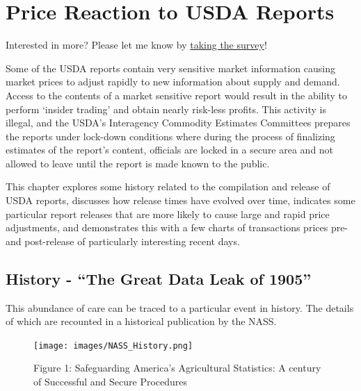 \documentclass[
  letterpaper,
  DIV=11,
  numbers=noendperiod]{scrreprt}
\begin{document}

\hypertarget{price-reaction-to-usda-reports-1}{%
\chapter{Price Reaction to USDA
Reports}\label{price-reaction-to-usda-reports-1}}

{Interested in more? Please let me know by}
\href{https://forms.gle/Q3VByCQZHjfQSy9D7}{taking the survey}!

Some of the USDA reports contain very sensitive market information
causing market prices to adjust rapidly to new information about supply
and demand. Access to the contents of a market sensitive report would
result in the ability to perform `insider trading' and obtain nearly
risk-less profits. This activity is illegal, and the USDA's Interagency
Commodity Estimates Committees prepares the reports under lock-down
conditions where during the process of finalizing estimates of the
report's content, officials are locked in a secure area and not allowed
to leave until the report is made known to the public.

This chapter explores some history related to the compilation and
release of USDA reports, discusses how release times have evolved over
time, indicates some particular report releases that are more likely to
cause large and rapid price adjustments, and demonstrates this with a
few charts of transactions prices pre- and post-release of particularly
interesting recent days.

\hypertarget{history---the-great-data-leak-of-1905-1}{%
\section{History - ``The Great Data Leak of
1905''}\label{history---the-great-data-leak-of-1905-1}}

This abundance of care can be traced to a particular event in history.
The details of which are recounted in a historical publication by the
NASS.

\begin{figure}

{\centering \texttt{[image: images/NASS\_History.png]}

}

\caption{Figure 1: Safeguarding America's Agricultural Statistics: A
century of Successful and Secure Procedures}

\end{figure}
\end{document}
